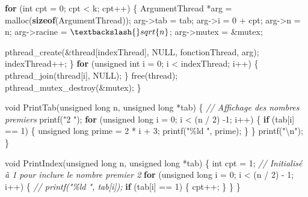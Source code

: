 \documentclass[
]{article}
\newenvironment{Shaded}{}{}
\newcommand{\CommentTok}[1]{\textcolor[rgb]{0.38,0.63,0.69}{\textit{#1}}}
\newcommand{\ControlFlowTok}[1]{\textcolor[rgb]{0.00,0.44,0.13}{\textbf{#1}}}
\newcommand{\DataTypeTok}[1]{\textcolor[rgb]{0.56,0.13,0.00}{#1}}
\newcommand{\DecValTok}[1]{\textcolor[rgb]{0.25,0.63,0.44}{#1}}
\newcommand{\KeywordTok}[1]{\textcolor[rgb]{0.00,0.44,0.13}{\textbf{#1}}}
\newcommand{\NormalTok}[1]{#1}
\newcommand{\SpecialCharTok}[1]{\textcolor[rgb]{0.25,0.44,0.63}{#1}}
\newcommand{\StringTok}[1]{\textcolor[rgb]{0.25,0.44,0.63}{#1}}
\begin{document}
\begin{Shaded}
\begin{Highlighting}[]
    \ControlFlowTok{for}\NormalTok{ (}\DataTypeTok{int}\NormalTok{ cpt = }\DecValTok{0}\NormalTok{; cpt \textless{} k; cpt++)}
\NormalTok{    \{}
\NormalTok{        ArgumentThread *arg = malloc(}\KeywordTok{sizeof}\NormalTok{(ArgumentThread));}
\NormalTok{        arg{-}\textgreater{}tab = tab;}
\NormalTok{        arg{-}\textgreater{}i = }\DecValTok{0}\NormalTok{ + cpt;}
\NormalTok{        arg{-}\textgreater{}n = n;}
\NormalTok{        arg{-}\textgreater{}racine = $\textbackslash{}sqrt\{n\}$;}
\NormalTok{        arg{-}\textgreater{}mutex = \&mutex;}

\NormalTok{        pthread\_create(\&thread[indexThread], NULL, fonctionThread, arg);}
\NormalTok{        indexThread++;}
\NormalTok{    \}}
    \ControlFlowTok{for}\NormalTok{ (}\DataTypeTok{unsigned} \DataTypeTok{int}\NormalTok{ i = }\DecValTok{0}\NormalTok{; i \textless{} indexThread; i++)}
\NormalTok{    \{}
\NormalTok{        pthread\_join(thread[i], NULL);}
\NormalTok{    \}}
\NormalTok{    free(thread);}
\NormalTok{    pthread\_mutex\_destroy(\&mutex);}
\NormalTok{\}}

\DataTypeTok{void}\NormalTok{ PrintTab(}\DataTypeTok{unsigned} \DataTypeTok{long}\NormalTok{ n, }\DataTypeTok{unsigned} \DataTypeTok{long}\NormalTok{ *tab)}
\NormalTok{\{}
    \CommentTok{// Affichage des nombres premiers}
\NormalTok{    printf(}\StringTok{"2 "}\NormalTok{);}
    \ControlFlowTok{for}\NormalTok{ (}\DataTypeTok{unsigned} \DataTypeTok{long}\NormalTok{ i = }\DecValTok{0}\NormalTok{; i \textless{} (n / }\DecValTok{2}\NormalTok{) {-}}\DecValTok{1}\NormalTok{; i++)}
\NormalTok{    \{}
        \ControlFlowTok{if}\NormalTok{ (tab[i] == }\DecValTok{1}\NormalTok{)}
\NormalTok{        \{}
            \DataTypeTok{unsigned} \DataTypeTok{long}\NormalTok{ prime = }\DecValTok{2}\NormalTok{ * i + }\DecValTok{3}\NormalTok{;}
\NormalTok{            printf(}\StringTok{"\%ld "}\NormalTok{, prime);}
\NormalTok{        \}}
\NormalTok{    \}}
\NormalTok{    printf(}\StringTok{"}\SpecialCharTok{\textbackslash{}n}\StringTok{"}\NormalTok{);}
\NormalTok{\}}

\DataTypeTok{void}\NormalTok{ PrintIndex(}\DataTypeTok{unsigned} \DataTypeTok{long}\NormalTok{ n, }\DataTypeTok{unsigned} \DataTypeTok{long}\NormalTok{ *tab)}
\NormalTok{\{}
    \DataTypeTok{int}\NormalTok{ cpt = }\DecValTok{1}\NormalTok{; }\CommentTok{// Initialisé à 1 pour inclure le nombre premier 2}
    \ControlFlowTok{for}\NormalTok{ (}\DataTypeTok{unsigned} \DataTypeTok{long}\NormalTok{ i = }\DecValTok{0}\NormalTok{; i \textless{} (n / }\DecValTok{2}\NormalTok{) {-} }\DecValTok{1}\NormalTok{; i++)}
\NormalTok{    \{}
        \CommentTok{// printf("\%ld ", tab[i]);}
        \ControlFlowTok{if}\NormalTok{ (tab[i] == }\DecValTok{1}\NormalTok{)}
\NormalTok{        \{}
\NormalTok{            cpt++;}
\NormalTok{        \}}
\NormalTok{    \}}
\NormalTok{\}}


\end{Highlighting}
\end{Shaded}
\end{document}
